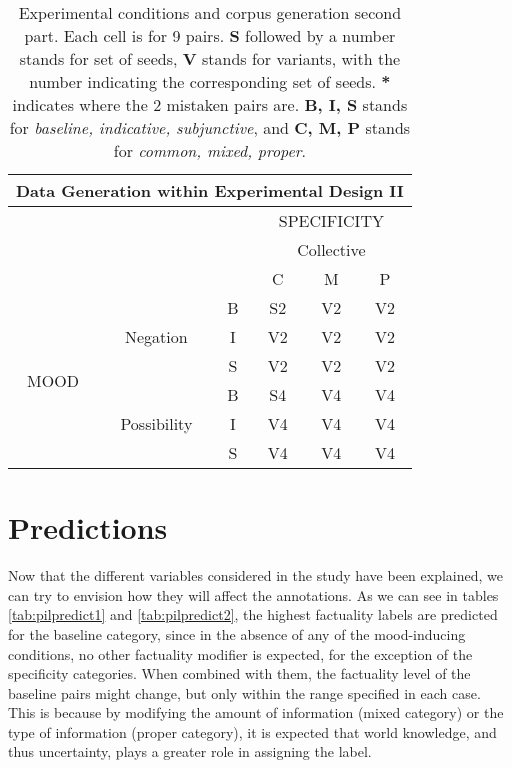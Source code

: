 \begin{table}[h!]
\centering
\begin{tabular}{|c|c|c|c|c|c|}
\hline
\multicolumn{6}{|c|}{Data Generation within Experimental Design II}\\\hline
                      & & &\multicolumn{3}{c|}{SPECIFICITY} \\\cline{4-6} 
                      & & & \multicolumn{3}{c|}{Collective}\\\cline{4-6} 
                      & & & C & M & P \\\hline 
\multirow{6}{*}{MOOD} & \multirow{3}{*}{Negation} & B &S2 &V2 &V2\\\cline{3-6}
                      &                           & I & V2 &V2 &V2\\\cline{3-6}
                      &                           & S &V2 &V2 &V2\\ \cline{2-6}\cline{2-6}                     
                      &\multirow{3}{*}{Possibility}& B&S4 &V4 &V4\\\cline{3-6}
                      &                           & I & V4 & V4 & V4\\\cline{3-6}
                      &                           & S  & V4 & V4 & V4\\\hline                                                          
\end{tabular}
\caption[Experimental conditions and corpus generation II.]{Experimental conditions and corpus generation second part. Each cell is for 9 pairs. \textbf{S} followed by a number stands for set of seeds, \textbf{V} stands for variants, with the number indicating the corresponding set of seeds. \textbf{*} indicates where the 2 mistaken pairs are. \textbf{B, I, S} stands for \textit{baseline, indicative, subjunctive}, and \textbf{C, M, P} stands for \textit{common, mixed, proper}.}
\label{tab:datagen2}
\end{table}

\section{Predictions}
Now that the different variables considered in the study have been explained, we can try to envision how they will affect the annotations. As we can see in tables \ref{tab:pilpredict1} and \ref{tab:pilpredict2}, the highest factuality labels are predicted for the baseline category, since in the absence of any of the mood-inducing conditions, no other factuality modifier is expected, for the exception of the specificity categories. When combined with them, the factuality level of the baseline pairs might change, but only within the range specified in each case. This is because by modifying the amount of information (mixed category) or the type of information (proper category), it is expected that world knowledge, and thus uncertainty, plays a greater role in assigning the label.\\

